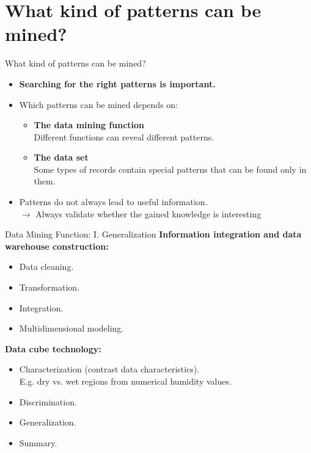 \section{What kind of patterns can be mined?}

\begin{frame}{What kind of patterns can be mined?}
	\begin{itemize}
		\item \textbf{Searching for the right patterns is important.}
		\item Which patterns can be mined depends on:
		\begin{itemize}
			\item \textbf{The data mining function} \\
				  \small{Different functions can reveal different patterns.}
			\item \textbf{The data set} \\
				  \small{Some types of records contain special patterns that 
				  can be found only in them.}
		\end{itemize}
		\item Patterns do not always lead to useful information. \\
				$\rightarrow$ Always validate whether the gained knowledge is 
				interesting
	\end{itemize}
\end{frame}

\begin{frame}{Data Mining Function: I. Generalization}
	\textbf{Information integration and data warehouse construction:}
	\begin{itemize}
		\item Data cleaning.
		\item Transformation.
		\item Integration.
		\item Multidimensional modeling.
	\end{itemize}
	\textbf{Data cube technology:}
	\begin{itemize}
		\item Characterization (contrast data characteristics).\\
		E.g. dry vs. wet regions from numerical humidity values.
		\item Discrimination.
		\item Generalization.
		\item Summary.
	\end{itemize}
\end{frame}

